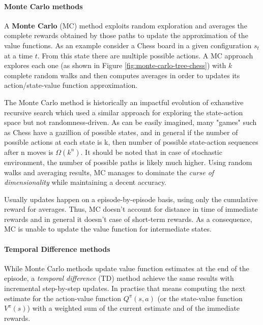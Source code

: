 \paragraph{Monte Carlo methods}

A \textbf{Monte Carlo} (MC) \cite{NIPS2014_88bf0c64} method exploits random exploration and averages the complete rewards obtained by those paths to update the approximation of the value functions.
As an example consider a Chess board in a given configuration $s_t$ at a time $t$. From this state there are multiple possible actions. A MC approach explores each one (as shown in Figure \ref{fig:monte-carlo-tree-chess}) with $k$ complete random walks and then computes averages in order to updates its action/state-value function approximation.

The Monte Carlo method is historically an impactful evolution of exhaustive recursive search which used a similar approach for exploring the state-action space but not randomness-driven. As can be easily imagined, many "games" such as Chess have a gazillion of possible states, and in general if the number of possible actions at each state is k, then number of possible state-action sequences after n moves is $\Omega(k^n)$. It should be noted that in case of stochastic environment, the number of possible paths is likely much higher. Using random walks and averaging results, MC manages to dominate the \textit{curse of dimensionality} while maintaining a decent accuracy.

Usually updates happen on a episode-by-episode basis, using only the cumulative reward for averages. Thus, MC doesn't account for distance in time of immediate rewards and in general it doesn't case of short-term rewards. As a consequence, MC is unable to update the value function for intermediate states.


\paragraph{Temporal Difference methods}

While Monte Carlo methods update value function estimates at the end of the episode, a \textit{temporal difference} (TD) \cite{sutton1988learning} method achieve the same results with incremental step-by-step updates.
In practise that means computing the next estimate for the action-value function $Q^\pi(s, a)$ (or the state-value function $V^\pi(s)$) with a weighted sum of the current estimate and of the immediate rewards.

